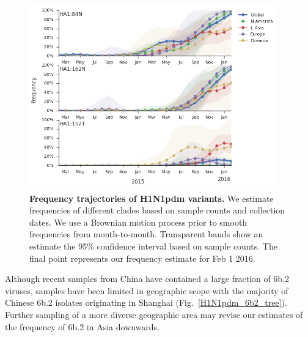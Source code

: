 \documentclass[11pt,oneside,letterpaper]{article}
\begin{document}
\begin{figure}[H]
	\centering		
	\includegraphics[width=0.95\textwidth]{../figures/feb-2016/H1N1pdm_mutations.png}
	\caption{\textbf{Frequency trajectories of H1N1pdm variants.}
	We estimate frequencies of different clades based on sample counts and collection dates.
	We use a Brownian motion process prior to smooth frequencies from month-to-month.
	Transparent bands show an estimate the 95\% confidence interval based on sample counts.
	The final point represents our frequency estimate for Feb 1 2016.	
	}
	\label{H1N1pdm_mutations}
\end{figure}

\pagebreak

Although recent samples from China have contained a large fraction of 6b.2 viruses, samples have been limited in geographic scope with the majority of Chinese 6b.2 isolates originating in Shanghai (Fig.\ \ref{H1N1pdm_6b2_tree}). Further sampling of a more diverse geographic area may revise our estimates of the frequency of 6b.2 in Asia downwards.
\end{document}
